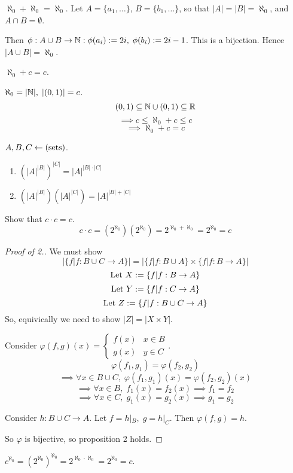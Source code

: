 \documentclass[12pt]{article}
\begin{document}
\bboxex
{} \(\aleph_0+\aleph_0=\aleph_0\). Let \(A=\{a_1,\dots\}\),
\(B=\{b_1,\dots\}\), so that \(|A|=|B|=\aleph_0\), and \(A\cap B=\emptyset\).

Then \(\phi:A\cup B\to\mathbb N:
\phi(a_i):=2i,\;
\phi(b_i):=2i-1\).
This is a bijection.
Hence
\(|A\cup B|=\aleph_0\).
\ebox

\bboxex
{} \(\aleph_0+c=c\).

\(\aleph_0=|\mathbb N|,\;|(0,1)|=c\).
\[(0,1)\subseteq\mathbb N\cup(0,1)
\subseteq\mathbb R\]
\[\implies c\le\aleph_0+c\le c\]
\[\implies \aleph_0+c=c\]
\ebox


\bbox
\begin{prop}
  \(A,B,C\leftarrow(\mathrm{sets})\).
  \begin{enumerate}
    \item \((|A|^{|B|})^{|C|}
      = |A|^{|B|\cdot|C|}\)
    \item \((|A|^{|B|})(|A|^{|C|})
      = |A|^{|B|+|C|}\)
  \end{enumerate}
\end{prop}
\ebox

\bboxex
{} Show that \(c\cdot c=c\).
\[c\cdot c=(2^{\aleph_0})(2^{\aleph_0})
=2^{\aleph_0+\aleph_0}=2^{\aleph_0}=c\]
\ebox



\bboxproof
\begin{proof}[Proof of 2.]
  We must show
  \[|\{f|f:B\cup C\to A\}|
  =|\{f|f:B\cup A\}\times\{f|f:B\to A\}|\]
  \[\text{Let }X:=\{f|f:B\to A\}\]
  \[\text{Let }Y:=\{f|f:C\to A\}\]
  \[\text{Let }Z:=\{f|f:B\cup C\to A\}\]
  So, equivically we need to show \(|Z|=|X\times Y|\).
  
  Consider \(\varphi(f,g)(x)=\begin{cases}f(x)&x\in B\\ g(x)&y\in C\end{cases}\).
  \[\varphi(f_1,g_1)=\varphi(f_2,g_2)\]
  \[\implies\forall x\in B\cup C,\;
  \varphi(f_1,g_1)(x)=\varphi(f_2,g_2)(x)\]
  \[\implies\forall x\in B,\;f_1(x)=f_2(x)\implies f_1=f_2\]
  \[\implies\forall x\in C,\;g_1(x)=g_2(x)\implies g_1=g_2\]

  Consider \(h:B\cup C\to A\). Let \(f=h|_B,\;g=h|_C\). Then
  \(\varphi(f,g)=h\).

  So \(\varphi\) is bijective, so proposition 2 holds.
\end{proof}
\ebox


\bboxex
{} \(c^{\aleph_0}=(2^{\aleph_0})^{\aleph_0}
=2^{\aleph_0\cdot\aleph_0}=2^{\aleph_0}=c\).
\ebox
\end{document}
